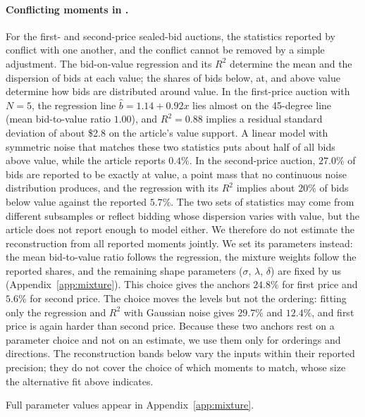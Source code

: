 \documentclass[acmsmall,screen,review]{acmart}
\newenvironment{revblock}{\color{blue}}{}
\newenvironment{revblock}{}{}
\begin{document}
\begin{revblock}
\paragraph{Conflicting moments in \citet{kagel1993independent}.}\label{sec:kl93_conflict}
For the first- and second-price sealed-bid auctions, the statistics reported by \citet{kagel1993independent} conflict with one another, and the conflict cannot be removed by a simple adjustment. The bid-on-value regression and its $R^2$ determine the mean and the dispersion of bids at each value; the shares of bids below, at, and above value determine how bids are distributed around value. In the first-price auction with $N=5$, the regression line $\hat b=1.14+0.92x$ lies almost on the 45-degree line (mean bid-to-value ratio $1.00$), and $R^2=0.88$ implies a residual standard deviation of about \$2.8 on the article's value support. A linear model with symmetric noise that matches these two statistics puts about half of all bids above value, while the article reports $0.4\%$. In the second-price auction, $27.0\%$ of bids are reported to be exactly at value, a point mass that no continuous noise distribution produces, and the regression with its $R^2$ implies about $20\%$ of bids below value against the reported $5.7\%$. The two sets of statistics may come from different subsamples or reflect bidding whose dispersion varies with value, but the article does not report enough to model either. We therefore do not estimate the reconstruction from all reported moments jointly. We set its parameters instead: the mean bid-to-value ratio follows the regression, the mixture weights follow the reported shares, and the remaining shape parameters ($\sigma$, $\lambda$, $\delta$) are fixed by us (Appendix~\ref{app:mixture}). This choice gives the anchors $24.8\%$ for first price and $5.6\%$ for second price. The choice moves the levels but not the ordering: fitting only the regression and $R^2$ with Gaussian noise gives $29.7\%$ and $12.4\%$, and first price is again harder than second price. Because these two anchors rest on a parameter choice and not on an estimate, we use them only for orderings and directions. The reconstruction bands below vary the inputs within their reported precision; they do not cover the choice of which moments to match, whose size the alternative fit above indicates.
\end{revblock}

Full parameter values appear in Appendix~\ref{app:mixture}.
\end{document}

